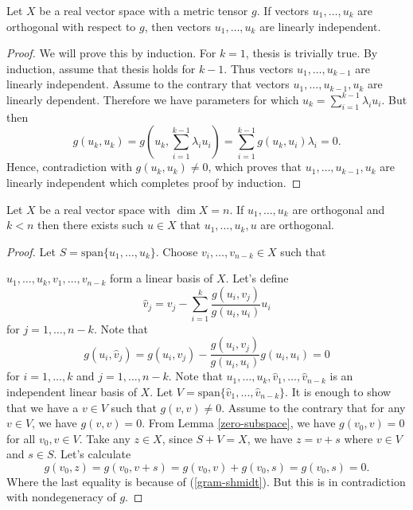 \documentclass[main.tex]{subfiles}
\begin{document}
\begin{theorem}
Let $X$ be a real vector space with a metric tensor $g$. If vectors $u_1, \dots, u_k$ are orthogonal with respect to $g$, then vectors $u_1, \dots, u_k$ are linearly independent.
\end{theorem}
\begin{proof}
We will prove this by induction. For $k=1$, thesis is trivially true. By induction, assume that thesis holds for $k-1$. Thus vectors $u_1, \dots, u_{k-1}$ are linearly independent. Assume to the contrary that vectors $u_1, \dots, u_{k-1}, u_k$ are linearly dependent. Therefore we have parameters for which $u_k = \sum_{i=1}^{k-1} \lambda_i u_i$. But then
\begin{equation}
g(u_k, u_k) = g(u_k, \sum_{i=1}^{k-1} \lambda_i u_i) =  \sum_{i=1}^{k-1} g(u_k, u_i) \lambda_i = 0.
\end{equation}
Hence, contradiction with $g(u_k, u_k)\not= 0$, which proves that $u_1, \dots, u_{k-1}, u_k$ are linearly independent which completes proof by induction. 
\end{proof}

\begin{lemma}
Let $X$ be a real vector space with $\dim X = n$. If $u_1, \dots, u_k$ are orthogonal and $k < n$ then there exists such $u\in X$ that $u_1, \dots, u_k, u$ are orthogonal.
\end{lemma}
\begin{proof}
Let $S = \text{span}\{u_1, \dots, u_k\}$. Choose $v_i, \dots, v_{n - k}\in X$ such that
 
$u_1, \dots, u_k, v_1, \dots, v_{n-k}$ form a linear basis of $X$.
Let's define
\begin{equation}
\hat{v}_j = v_j - \sum_{i=1}^k \frac{g(u_i, v_j)}{g(u_i, u_i)}u_i
\end{equation} 
for $j=1, \dots, n - k$.
Note that 
\begin{equation}
\label{gram-shmidt}
g(u_i, \hat{v}_j) = g(u_i, v_j) - \frac{g(u_i, v_j)}{g(u_i, u_i)}g(u_i, u_i) = 0
\end{equation}
for $i=1, \dots, k$ and $j=1, \dots, n - k$. Note that $u_1, \dots, u_k, \hat{v}_1, \dots, \hat{v}_{n-k}$ is an independent linear basis of $X$. Let $V = \text{span}\{\hat{v}_1, \dots, \hat{v}_{n-k}\}$. It is enough to show that we have a $v\in V$ such that $g(v, v)\not=0$. Assume to the contrary that for any $v\in V$, we have $g(v, v)=0$. From Lemma \ref{zero-subspace}, we have $g(v_0, v)=0$ for all $v_0, v\in V$. Take any $z\in X$, since $S + V = X$, we have $z = v + s$ where $v\in V$ and $s\in S$.
Let's calculate
\begin{equation}
g(v_0, z) = g(v_0, v + s) = g(v_0, v) + g(v_0, s) = g(v_0, s) = 0.
\end{equation}
Where the last equality is because of (\ref{gram-shmidt}). But this is in contradiction with nondegeneracy of $g$.
\end{proof}
\end{document}
